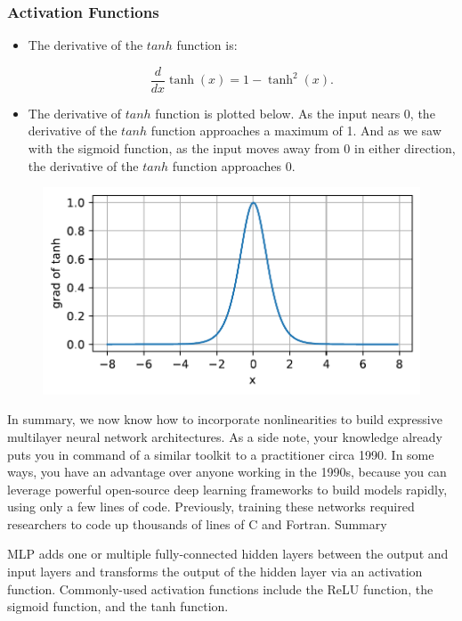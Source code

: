 \documentclass[
  shownotes,
  xcolor={svgnames},
  hyperref={colorlinks,citecolor=DarkBlue,linkcolor=DarkRed,urlcolor=DarkBlue}
  , aspectratio=169]{beamer}
\begin{document}
\begin{frame}
\frametitle{Activation Functions}

\begin{itemize}
\item The derivative of the $tanh$ function is:

$$\frac{d}{dx} \operatorname{tanh}(x) = 1 - \operatorname{tanh}^2(x).$$

\item The derivative of $tanh$ function is plotted below. As the input nears 0, the derivative of the $tanh$ function approaches a maximum of 1. And as we saw with the sigmoid function, as the input moves away from 0 in either direction, the derivative of the $tanh$ function approaches 0.
\end{itemize}


  \begin{figure}[H] \centering
            \captionsetup{justification=centering}
              \includegraphics[scale=0.45]{figures/tanh_dev}
              
 \end{figure}
In summary, we now know how to incorporate nonlinearities to build expressive multilayer neural network architectures. As a side note, your knowledge already puts you in command of a similar toolkit to a practitioner circa 1990. In some ways, you have an advantage over anyone working in the 1990s, because you can leverage powerful open-source deep learning frameworks to build models rapidly, using only a few lines of code. Previously, training these networks required researchers to code up thousands of lines of C and Fortran.
Summary

    MLP adds one or multiple fully-connected hidden layers between the output and input layers and transforms the output of the hidden layer via an activation function.
    Commonly-used activation functions include the ReLU function, the sigmoid function, and the tanh function.


\end{frame}
\end{document}
